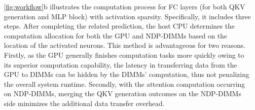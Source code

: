 


\fig \ref{fig:workflow}b illustrates the computation process for FC layers (for both QKV generation and MLP block) with activation sparsity. Specifically, it includes three steps.
After completing the related prediction, the host CPU determines the computation allocation for both the GPU and NDP-DIMMs based on the location of the activated neurons.
 This method is advantageous for two reasons. Firstly, as the GPU generally finishes computation tasks more quickly owing to its superior computation capability, the latency in transferring data from the GPU to DIMMs can be hidden by the DIMMs' computation, thus not penalizing the overall system runtime. Secondly, with the attention computation occurring on NDP-DIMMs, merging the QKV generation outcomes on the NDP-DIMMs side minimizes the additional data transfer overhead.


